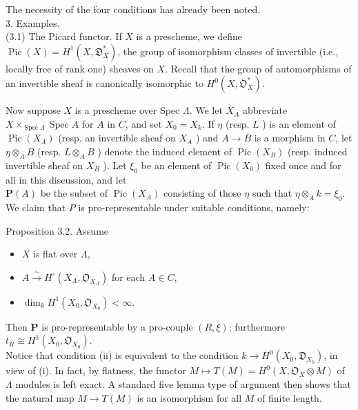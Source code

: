 \documentclass[10pt]{article}
\begin{document}
The necessity of the four conditions has already been noted.\\
3. Examples.\\
(3.1) The Picard functor. If $X$ is a prescheme, we define $\operatorname{Pic}(X)=H^{1}\left(X, \mathfrak{D}_{X}^{*}\right)$, the group of isomorphism classes of invertible (i.e., locally free of rank one) sheaves on $X$. Recall that the group of automorphisms of an invertible sheaf is canonically isomorphic to $H^{0}\left(X, \mathfrak{O}_{X}^{*}\right)$.

Now suppose $X$ is a prescheme over Spec $\Lambda$. We let $X_{A}$ abbreviate $X \times_{\operatorname{Spec} \Lambda} \operatorname{Spec} A$ for $A$ in $C$, and set $X_{0}=X_{k}$. If $\eta$ (resp. $L$ ) is an element of $\operatorname{Pic}\left(X_{A}\right)$ (resp. an invertible sheaf on $X_{A}$ ) and $A \rightarrow B$ is a morphism in $C$, let $\eta \otimes_{A} B$ (resp. $L \otimes_{A} B$ ) denote the induced element of $\operatorname{Pic}\left(X_{B}\right)$ (resp. induced invertible sheaf on $X_{B}$ ). Let $\xi_{0}$ be an element of $\operatorname{Pic}\left(X_{0}\right)$ fixed once and for all in this discussion, and let\\
$\boldsymbol{P}(A)$ be the subset of $\operatorname{Pic}\left(X_{A}\right)$ consisting of those $\eta$ such that $\eta \otimes_{A} k=\xi_{0}$. We claim that $P$ is pro-representable under suitable conditions, namely:

Proposition 3.2. Assume

\begin{itemize}
  \item[(i)] $X$ is flat over $\Lambda$,
  \item[(ii)] $A \xrightarrow{\sim} H^{\circ}\left(X_{A}, \mathfrak{O}_{X_{A}}\right)$ for each $A \in C$,
  \item[(iii)] $\operatorname{dim}_{k} H^{1}\left(X_{0}, \mathfrak{O}_{X_{0}}\right)<\infty$.
\end{itemize}

Then $\boldsymbol{P}$ is pro-representable by a pro-couple $(R, \xi)$; furthermore $t_{R} \cong H^{1}\left(X_{0}, \mathfrak{O}_{X_{0}}\right)$.\\
Notice that condition (ii) is equivalent to the condition $k \longrightarrow H^{0}\left(X_{0}, \mathfrak{D}_{X_{0}}\right)$, in view of (i). In fact, by flatness, the functor $M \mapsto T(M)=H^{0}\left(X, \mathfrak{O}_{X} \otimes M\right)$ of $\Lambda$ modules is left exact. A standard five lemma type of argument then shows that the natural map $M \rightarrow T(M)$ is an isomorphism for all $M$ of finite length.
\end{document}
